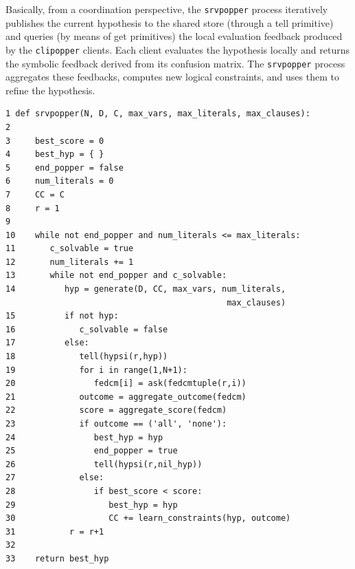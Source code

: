 




Basically, from a coordination perspective, the \texttt{srvpopper} process iteratively publishes the current hypothesis to the shared store (through a tell primitive) and queries (by means of get primitives) the local evaluation feedback produced by the \texttt{clipopper} clients. Each client evaluates the hypothesis locally and returns the symbolic feedback derived from its confusion matrix. The \texttt{srvpopper} process aggregates these feedbacks, computes new logical constraints, and uses them to refine the hypothesis. 

\begin{algorithm}[!t]
  \caption{Srvpopper client}
  \label{alg:srvpopper}
  \small
  \begin{lstlisting}[breaklines=true, breakatwhitespace=true]
1 def srvpopper(N, D, C, max_vars, max_literals, max_clauses):
2 
3     best_score = 0
4     best_hyp = { }
5     end_popper = false
6     num_literals = 0
7     CC = C
8     r = 1
9 
10    while not end_popper and num_literals <= max_literals:
11       c_solvable = true
12       num_literals += 1
13       while not end_popper and c_solvable:
14          hyp = generate(D, CC, max_vars, num_literals, 
                                             max_clauses)
15          if not hyp:
16             c_solvable = false
17          else:
18             tell(hypsi(r,hyp))
19             for i in range(1,N+1):
20                fedcm[i] = ask(fedcmtuple(r,i))
21             outcome = aggregate_outcome(fedcm)
22             score = aggregate_score(fedcm)
23             if outcome == ('all', 'none'):
24                best_hyp = hyp
25                end_popper = true
26                tell(hypsi(r,nil_hyp))                
27             else:
28                if best_score < score:
29                   best_hyp = hyp
30                   CC += learn_constraints(hyp, outcome)
31           r = r+1
32                   
33    return best_hyp
  \end{lstlisting}
\end{algorithm}


